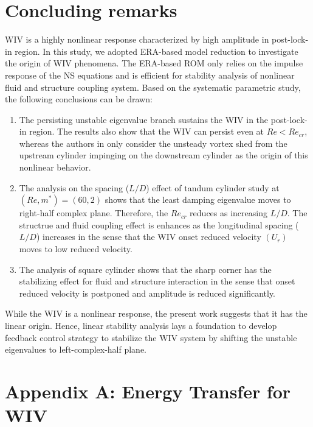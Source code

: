 \section{Concluding remarks}\label{sec:conclusion}
WIV is a highly nonlinear response characterized by high amplitude in post-lock-in region. 
In this study, we adopted ERA-based model reduction to investigate the origin of WIV phenomena. 
The ERA-based ROM only relies on the impulse response of the NS equations and is efficient 
for stability analysis of nonlinear fluid and structure coupling system. 
Based on the systematic parametric study, the following conclusions can be drawn:

\begin{enumerate}
\item{
The persisting unstable eigenvalue branch sustains the WIV in the post-lock-in 
region. The results also show that the WIV can persist even at $Re<Re_{cr}$, whereas the authors in \cite{Mysa2016,MYSA201727} only consider the unsteady vortex shed from the upstream cylinder impinging on the downstream cylinder as the origin of 
this nonlinear behavior. 
}

\item{
The analysis on the spacing ($L/D$) effect of tandum cylinder study at $(Re,m^*)=(60,2)$ 
shows that the least damping eigenvalue moves to right-half complex plane. Therefore, the 
$Re_{cr}$ reduces as increasing $L/D$. 
The structrue and fluid coupling effect is enhances as the longitudinal spacing ($L/D$) increases 
in the sense that the WIV onset reduced velocity $(U_r)$ moves to low reduced velocity. 

}


\item{
The analysis of square cylinder shows that the sharp corner has the stabilizing effect for 
fluid and structure interaction in the sense that onset reduced velocity is postponed and amplitude is reduced significantly. 


}
\end{enumerate}

While the WIV is a nonlinear response, the present work suggests that it has the linear origin. Hence, 
linear stability analysis lays a foundation to develop feedback control strategy to stabilize the WIV system 
by shifting the unstable eigenvalues to left-complex-half plane. 


\section*{Appendix A: Energy Transfer for WIV}\label{app:A} 


